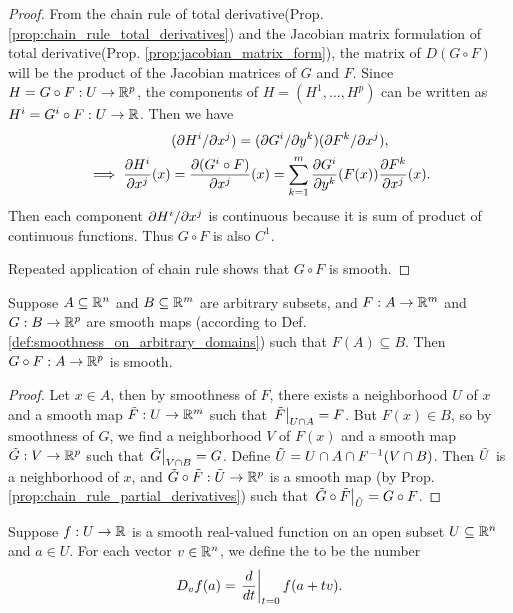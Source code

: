 \documentclass[11pt,a4paper]{article}
\begin{document}
\begin{proof}
 From the chain rule of total derivative(Prop. \ref{prop:chain_rule_total_derivatives}) and the Jacobian matrix formulation of total derivative(Prop. \ref{prop:jacobian_matrix_form}), the matrix of $D(G\circ F)$ will be the product of the Jacobian matrices of $G$ and $F$. Since $H = G\circ F:U\rightarrow \mathbb{R}^p$, the components of $H = (H^1,\ldots,H^p)$ can be written as $H^i = G^i\circ F:U\rightarrow \mathbb{R}$. Then we have
\begin{align*}
(\partial H^i/\partial x^{j}) =&\; (\partial G^i/\partial y^k) (\partial F^k/\partial x^{j}), \\
\implies \dfrac{\partial H^i}{\partial x^{j}}(x) = \dfrac{\partial (G^i\circ F)}{\partial x^{j}}&(x) = \sum_{k=1}^m \dfrac{\partial G^i}{\partial y^k}(F(x)) \dfrac{\partial F^k}{\partial x^{j}}(x).
\end{align*}
Then each component $\partial H^i/\partial x^{j}$ is continuous because it is sum of product of continuous functions. Thus $G\circ F$ is also $C^1$.

 Repeated application of chain rule shows that $G\circ F$ is smooth.
\end{proof}

\begin{proposition}
Suppose $A\subseteq \mathbb{R}^n$ and $B\subseteq \mathbb{R}^m$ are arbitrary subsets, and $F:A\rightarrow \mathbb{R}^m$ and $G:B\rightarrow \mathbb{R}^p$ are smooth maps (according to Def. \ref{def:smoothness_on_arbitrary_domains}) such that $F(A)\subseteq B$. Then $G\circ F:A\rightarrow \mathbb{R}^p$ is smooth.
\end{proposition}

\begin{proof}
Let $x\in A$, then by smoothness of $F$, there exists a neighborhood $U$ of $x$ and a smooth map $\Tilde{F}:U\rightarrow \mathbb{R}^m$ such that $ \left.\Tilde{F}\right|_{U\cap A} = F$. But $F(x)\in B$, so by smoothness of $G$, we find a neighborhood $V$ of $F(x)$ and a smooth map $\Tilde{G}:V\rightarrow \mathbb{R}^p$ such that $\left.\Tilde{G}\right|_{V\cap B} = G$. Define $\Tilde{U} = U\cap A\cap F^{-1}(V\cap B)$. Then $\Tilde{U}$ is a neighborhood of $x$, and $\Tilde{G}\circ \Tilde{F}:\Tilde{U}\rightarrow \mathbb{R}^p$ is a smooth map (by Prop. \ref{prop:chain_rule_partial_derivatives}) such that $\left.\Tilde{G}\circ \Tilde{F}\right|_{\Tilde{U}} = G\circ F$.
\end{proof}

\begin{definition}
Suppose $f:U\rightarrow \mathbb{R}$ is a smooth real-valued function on an open subset $U\subseteq \mathbb{R}^n$ and $a\in U$. For each vector $v\in \mathbb{R}^n$, we define the  to be the number 
\begin{equation}
D_v f(a) = \left.\dfrac{d}{dt}\right|_{t=0} f(a+tv).
\end{equation}
\end{definition}
\end{document}
